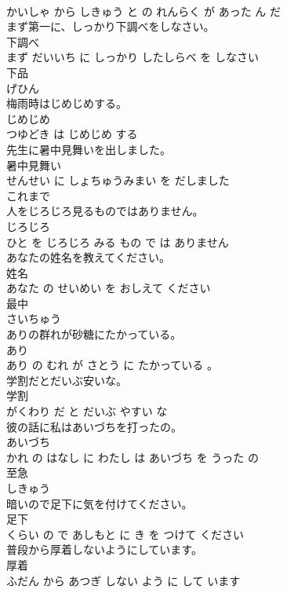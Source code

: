 \documentclass[8pt]{extreport}
\begin{document}
\begin{CJK}{UTF8}{min}
\\	かいしゃ から しきゅう と の れんらく が あった ん だ			
\\	まず第一に、しっかり下調べをしなさい。	
\\	下調べ 
\\	まず だいいち に しっかり したしらべ を しなさい			
\\	下品	
\\	げひん		
\\	梅雨時はじめじめする。	
\\	じめじめ 
\\	つゆどき は じめじめ する			
\\	先生に暑中見舞いを出しました。	
\\	暑中見舞い 
\\	せんせい に しょちゅうみまい を だしました			
\\	これまで	
\\	人をじろじろ見るものではありません。	
\\	じろじろ 
\\	ひと を じろじろ みる もの で は ありません			
\\	あなたの姓名を教えてください。	
\\	姓名 
\\	あなた の せいめい を おしえて ください			
\\	最中	
\\	さいちゅう		
\\	ありの群れが砂糖にたかっている。	
\\	あり 
\\	あり の むれ が さとう に たかっている 。			
\\	学割だとだいぶ安いな。	
\\	学割 
\\	がくわり だ と だいぶ やすい な			
\\	彼の話に私はあいづちを打ったの。	
\\	あいづち 
\\	かれ の はなし に わたし は あいづち を うった の			
\\	至急	
\\	しきゅう		
\\	暗いので足下に気を付けてください。	
\\	足下 
\\	くらい の で あしもと に き を つけて ください			
\\	普段から厚着しないようにしています。	
\\	厚着 
\\	ふだん から あつぎ しない よう に して います			

\end{CJK}
\end{document}
